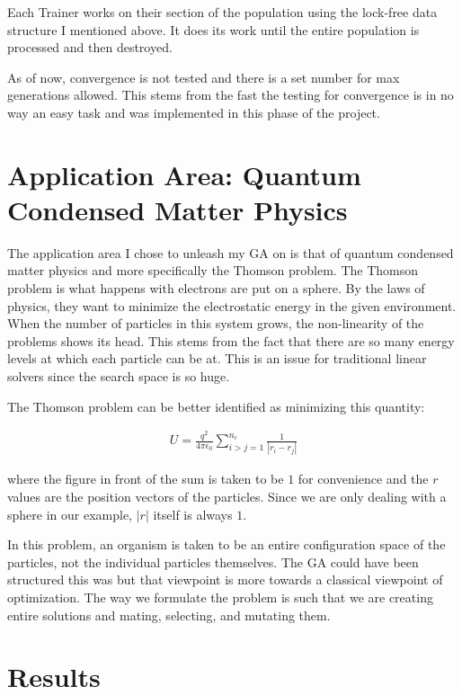 \documentclass{acm_proc_article-sp}
\begin{document}
Each Trainer works on their section of the population using the lock-free data structure I mentioned above. It does its work until the entire population is processed and then destroyed.

As of now, convergence is not tested and there is a set number for max generations allowed. This stems from the fast the testing for convergence is in no way an easy task and was implemented in this phase of the project.


%
%
\section{Application Area: Quantum Condensed Matter Physics}

The application area I chose to unleash my GA on is that of quantum condensed matter physics and more specifically the Thomson problem. The Thomson problem is what happens with electrons are put on a sphere. By the laws of physics, they want to minimize the electrostatic energy in the given environment. When the number of particles in this system grows, the non-linearity of the problems shows its head. This stems from the fact that there are so many energy levels at which each particle can be at. This is an issue for traditional linear solvers since the search space is so huge.

The Thomson problem can be better identified as minimizing this quantity:

\begin{eqnarray}
  U = \frac{q^2}{4\pi\epsilon_0} \sum_{i>j=1}^{n_c} \frac{1}{|r_i - r_j|}
\end{eqnarray}

where the figure in front of the sum is taken to be $1$ for convenience and the $r$ values are the position vectors of the particles. Since we are only dealing with a sphere in our example, $|r|$ itself is always $1$.

In this problem, an organism is taken to be an entire configuration space of the particles, not the individual particles themselves. The GA could have been structured this was but that viewpoint is more towards a classical viewpoint of optimization. The way we formulate the problem is such that we are creating entire solutions and mating, selecting, and mutating them.


%
%
\section{Results}
\end{document}
